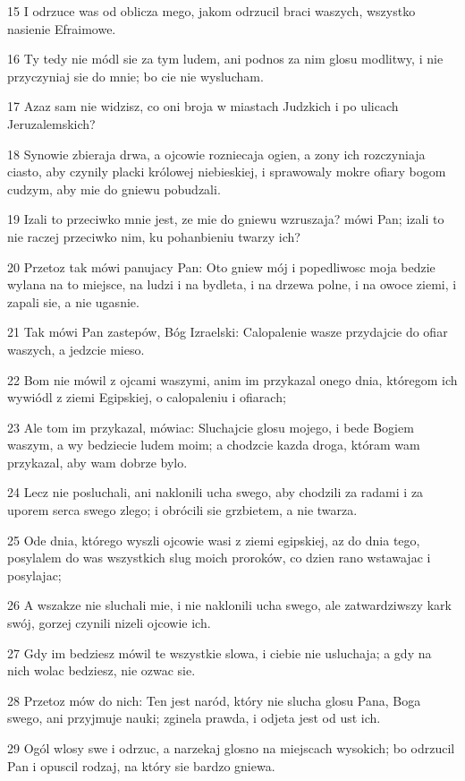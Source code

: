 \par 15 I odrzuce was od oblicza mego, jakom odrzucil braci waszych, wszystko nasienie Efraimowe.
\par 16 Ty tedy nie módl sie za tym ludem, ani podnos za nim glosu modlitwy, i nie przyczyniaj sie do mnie; bo cie nie wyslucham.
\par 17 Azaz sam nie widzisz, co oni broja w miastach Judzkich i po ulicach Jeruzalemskich?
\par 18 Synowie zbieraja drwa, a ojcowie rozniecaja ogien, a zony ich rozczyniaja ciasto, aby czynily placki królowej niebieskiej, i sprawowaly mokre ofiary bogom cudzym, aby mie do gniewu pobudzali.
\par 19 Izali to przeciwko mnie jest, ze mie do gniewu wzruszaja? mówi Pan; izali to nie raczej przeciwko nim, ku pohanbieniu twarzy ich?
\par 20 Przetoz tak mówi panujacy Pan: Oto gniew mój i popedliwosc moja bedzie wylana na to miejsce, na ludzi i na bydleta, i na drzewa polne, i na owoce ziemi, i zapali sie, a nie ugasnie.
\par 21 Tak mówi Pan zastepów, Bóg Izraelski: Calopalenie wasze przydajcie do ofiar waszych, a jedzcie mieso.
\par 22 Bom nie mówil z ojcami waszymi, anim im przykazal onego dnia, któregom ich wywiódl z ziemi Egipskiej, o calopaleniu i ofiarach;
\par 23 Ale tom im przykazal, mówiac: Sluchajcie glosu mojego, i bede Bogiem waszym, a wy bedziecie ludem moim; a chodzcie kazda droga, któram wam przykazal, aby wam dobrze bylo.
\par 24 Lecz nie posluchali, ani naklonili ucha swego, aby chodzili za radami i za uporem serca swego zlego; i obrócili sie grzbietem, a nie twarza.
\par 25 Ode dnia, którego wyszli ojcowie wasi z ziemi egipskiej, az do dnia tego, posylalem do was wszystkich slug moich proroków, co dzien rano wstawajac i posylajac;
\par 26 A wszakze nie sluchali mie, i nie naklonili ucha swego, ale zatwardziwszy kark swój, gorzej czynili nizeli ojcowie ich.
\par 27 Gdy im bedziesz mówil te wszystkie slowa, i ciebie nie usluchaja; a gdy na nich wolac bedziesz, nie ozwac sie.
\par 28 Przetoz mów do nich: Ten jest naród, który nie slucha glosu Pana, Boga swego, ani przyjmuje nauki; zginela prawda, i odjeta jest od ust ich.
\par 29 Ogól wlosy swe i odrzuc, a narzekaj glosno na miejscach wysokich; bo odrzucil Pan i opuscil rodzaj, na który sie bardzo gniewa.
